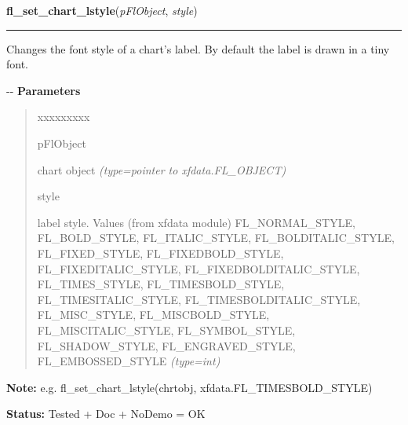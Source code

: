 \hspace{.8\funcindent}\begin{boxedminipage}{\funcwidth}

    \raggedright \textbf{fl\_set\_chart\_lstyle}(\textit{pFlObject}, \textit{style})

    \vspace{-1.5ex}

    \rule{\textwidth}{0.5\fboxrule}
\setlength{\parskip}{2ex}

Changes the font style of a chart's label. By default the label is
drawn in a tiny font.

-{}-
\setlength{\parskip}{1ex}
      \textbf{Parameters}
      \vspace{-1ex}

      \begin{quote}
        \begin{Ventry}{xxxxxxxxx}

          \item[pFlObject]


chart object
            {\it (type=pointer to xfdata.FL\_OBJECT)}

          \item[style]


label style. Values (from xfdata module) FL\_NORMAL\_STYLE,
FL\_BOLD\_STYLE, FL\_ITALIC\_STYLE, FL\_BOLDITALIC\_STYLE, FL\_FIXED\_STYLE,
FL\_FIXEDBOLD\_STYLE, FL\_FIXEDITALIC\_STYLE, FL\_FIXEDBOLDITALIC\_STYLE,
FL\_TIMES\_STYLE, FL\_TIMESBOLD\_STYLE, FL\_TIMESITALIC\_STYLE,
FL\_TIMESBOLDITALIC\_STYLE, FL\_MISC\_STYLE, FL\_MISCBOLD\_STYLE,
FL\_MISCITALIC\_STYLE, FL\_SYMBOL\_STYLE, FL\_SHADOW\_STYLE,
FL\_ENGRAVED\_STYLE, FL\_EMBOSSED\_STYLE
            {\it (type=int)}

        \end{Ventry}

      \end{quote}

\textbf{Note:} 
e.g. fl\_set\_chart\_lstyle(chrtobj, xfdata.FL\_TIMESBOLD\_STYLE)


\textbf{Status:} 
Tested + Doc + NoDemo = OK


    \end{boxedminipage}

    \label{xformslib:flchart:fl_set_chart_lsize}

    \vspace{0.5ex}

